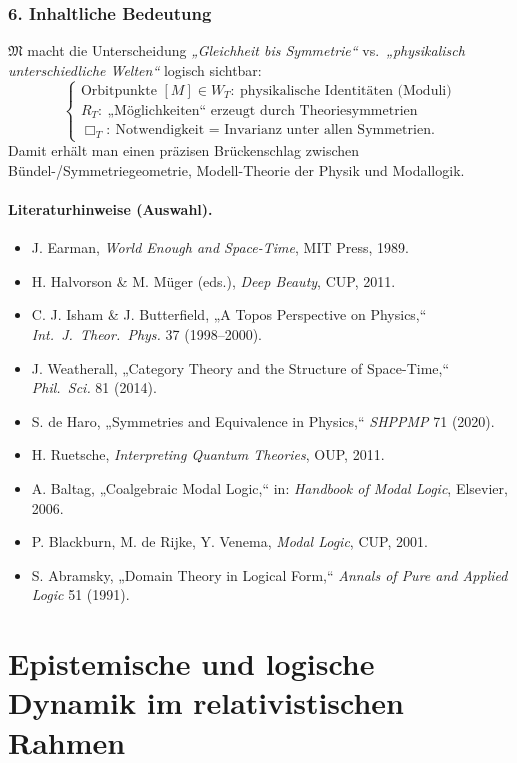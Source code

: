 \documentclass[10pt, letterpaper]{article}
\begin{document}
\subsubsection*{6. Inhaltliche Bedeutung}
$\mathfrak{M}$ macht die Unterscheidung \emph{„Gleichheit bis Symmetrie“} vs.\ 
\emph{„physikalisch unterschiedliche Welten“} logisch sichtbar:
\[
\begin{cases}
\text{Orbitpunkte }[M]\in W_T:\ \text{physikalische Identitäten (Moduli)}\\
R_T:\ \text{„Möglichkeiten“ erzeugt durch Theoriesymmetrien}\\
\Box_T:\ \text{Notwendigkeit = Invarianz unter allen Symmetrien.}
\end{cases}
\]
Damit erhält man einen präzisen Brückenschlag zwischen Bündel-/Symmetriegeometrie, 
Modell-Theorie der Physik und Modallogik.

\bigskip
\paragraph{Literaturhinweise (Auswahl).}
\begin{itemize}
\item J. Earman, \emph{World Enough and Space-Time}, MIT Press, 1989.
\item H. Halvorson \& M. Müger (eds.), \emph{Deep Beauty}, CUP, 2011.
\item C. J. Isham \& J. Butterfield, „A Topos Perspective on Physics,“ \emph{Int.\ J.\ Theor.\ Phys.} 37 (1998–2000).
\item J. Weatherall, „Category Theory and the Structure of Space-Time,“ \emph{Phil.\ Sci.} 81 (2014).
\item S. de Haro, „Symmetries and Equivalence in Physics,“ \emph{SHPPMP} 71 (2020).
\item H. Ruetsche, \emph{Interpreting Quantum Theories}, OUP, 2011.
\item A. Baltag, „Coalgebraic Modal Logic,“ in: \emph{Handbook of Modal Logic}, Elsevier, 2006.
\item P. Blackburn, M. de Rijke, Y. Venema, \emph{Modal Logic}, CUP, 2001.
\item S. Abramsky, „Domain Theory in Logical Form,“ \emph{Annals of Pure and Applied Logic} 51 (1991).
\end{itemize}


\section*{Epistemische und logische Dynamik im relativistischen Rahmen}
\end{document}

